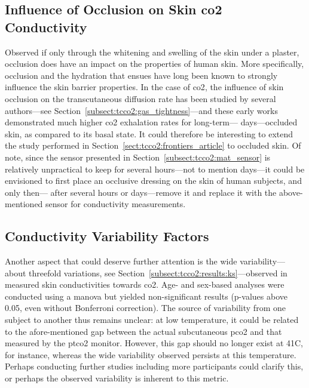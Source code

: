 \subsection{Influence of Occlusion on Skin \texorpdfstring{\gls{co2}}{CO2} Conductivity}

Observed if only through the whitening and swelling of the skin under a plaster, occlusion does have an impact on the properties of human skin. More specifically, occlusion and the hydration that ensues have long been known to strongly influence the skin barrier properties\cite{zhai2002}. In the case of \gls{co2}, the influence of skin occlusion on the transcutaneous diffusion rate has been studied by several authors\cite{frame1972, king1978, faergemann1983}---see Section~\ref{subsect:tcco2:gas_tightness}---and these early works demonstrated much higher \gls{co2} exhalation rates for long-term---\ie{} days---occluded skin, as compared to its basal state. It could therefore be interesting to extend the study performed in Section~\ref{sect:tcco2:frontiers_article} to occluded skin. Of note, since the sensor presented in Section~\ref{subsect:tcco2:mat_sensor} is relatively unpractical to keep for several hours---not to mention days---it could be envisioned to first place an occlusive dressing on the skin of human subjects, and only then---\ie{} after several hours or days---remove it and replace it with the above-mentioned sensor for conductivity measurements.

\subsection{Conductivity Variability Factors}

Another aspect that could deserve further attention is the wide variability---\ie{} about threefold variations, see Section~\ref{subsect:tcco2:results:ks}---observed in measured skin conductivities towards \gls{co2}. Age- and sex-based analyses were conducted using a \gls{manova} but yielded non-significant results (p-values above 0.05, even without Bonferroni correction). The source of variability from one subject to another thus remains unclear: at low temperature, it could be related to the afore-mentioned gap between the actual subcutaneous \gls{pco2} and that measured by the \gls{ptco2} monitor. However, this gap should no longer exist at 41{\degree}C, for instance, whereas the wide variability observed persists at this temperature. Perhaps conducting further studies including more participants could clarify this, or perhaps the observed variability is inherent to this metric.

